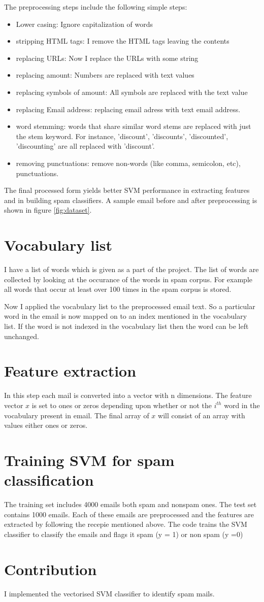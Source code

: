 \documentclass[twocolumn]{article}
\begin{document}
The preprocessing steps include the following simple steps:
\begin{itemize}
	\item Lower casing: Ignore capitalization of words
	\item stripping HTML tags: I remove the HTML tags leaving the contents
	\item replacing URLs: Now I replace the URLs with some string
	\item replacing amount: Numbers are replaced with text values
	\item replacing symbols of amount: All symbols are replaced with the text value
	\item replacing Email address: replacing email adress with text email address.
	\item word stemming: words that share similar word stems are replaced with just the stem keyword. For instance, 'discount', 'discounts', 'discounted', 'discounting' are all replaced with 'discount'.
	\item removing punctuations: remove non-words (like comma, semicolon, etc), punctuations.
\end{itemize}
The final processed form yields better SVM performance in extracting features and in building spam classifiers. A sample email before and after preprocessing is shown in figure \ref{fig:dataset}.
\section{Vocabulary list}
I have a list of words which is given as a part of the project. The list of words are collected by looking at the occurance of the words in spam corpus. For example   all words that  occur at least over 100 times in the spam corpus is stored.


Now I applied the vocabulary list to the preprocessed email text. So a particular word in the email is now mapped on to an index mentioned in the vocabulary list. If the word is not indexed in the vocabulary list then the word can be left unchanged.
\section{Feature extraction}
In this step each mail is converted into a vector with n dimensions. The feature vector $x$ is set to ones or zeros depending upon whether or not the $i^{th}$ word in the vocabulary present in email. The final array of $x$ will consist of an array with values either ones or zeros.
\section{Training SVM for spam classification}
The training set includes 4000 emails both spam and nonspam ones. The test set contains 1000 emails. Each of these emails are preprocessed and the features are extracted by following the recepie mentioned above. The code trains the SVM classifier to classify the emails and flags it spam (y = 1) or non spam (y =0)
\section{Contribution}
I implemented the vectorised SVM classifier to identify spam mails.
\end{document}
